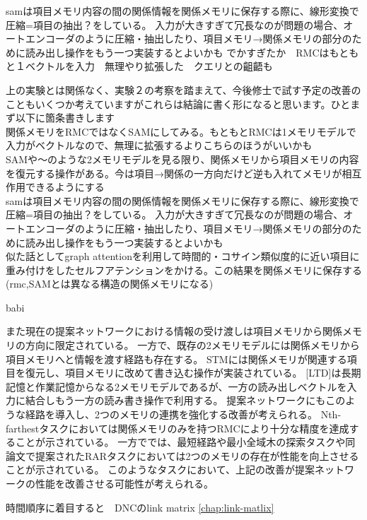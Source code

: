 samは項目メモリ内容の間の関係情報を関係メモリに保存する際に、線形変換で圧縮=項目の抽出？をしている。
入力が大きすぎて冗長なのが問題の場合、オートエンコーダのように圧縮・抽出したり、項目メモリ→関係メモリの部分のために読み出し操作をもう一つ実装するとよいかも
でかすぎたか　RMCはもともと１ベクトルを入力　無理やり拡張した　クエリとの齟齬も

上の実験とは関係なく、実験２の考察を踏まえて、今後修士で試す予定の改善のこともいくつか考えていますがこれらは結論に書く形になると思います。ひとまず以下に箇条書きします
\\関係メモリをRMCではなくSAMにしてみる。もともとRMCは1メモリモデルで入力がベクトルなので、無理に拡張するよりこちらのほうがいいかも
\\SAMや\cite{working2mem}〜のような2メモリモデルを見る限り、関係メモリから項目メモリの内容を復元する操作がある。今は項目→関係の一方向だけど逆も入れてメモリが相互作用できるようにする
\\samは項目メモリ内容の間の関係情報を関係メモリに保存する際に、線形変換で圧縮=項目の抽出？をしている。
入力が大きすぎて冗長なのが問題の場合、オートエンコーダのように圧縮・抽出したり、項目メモリ→関係メモリの部分のために読み出し操作をもう一つ実装するとよいかも
\\似た話としてgraph attentionを利用して時間的・コサイン類似度的に近い項目に重み付けをしたセルフアテンションをかける。この結果を関係メモリに保存する(rmc,SAMとは異なる構造の関係メモリになる)

babi 

また現在の提案ネットワークにおける情報の受け渡しは項目メモリから関係メモリの方向に限定されている。
一方で、既存の2メモリモデルには関係メモリから項目メモリへと情報を渡す経路も存在する。
STMには関係メモリが関連する項目を復元し、項目メモリに改めて書き込む操作が実装されている。
[LTD]は長期記憶と作業記憶からなる2メモリモデルであるが、一方の読み出しベクトルを入力に結合しもう一方の読み書き操作で利用する。
提案ネットワークにもこのような経路を導入し、2つのメモリの連携を強化する改善が考えられる。
Nth-farthestタスクにおいては関係メモリのみを持つRMCにより十分な精度を達成することが示されている。
一方で\cite{sam}では、最短経路や最小全域木の探索タスクや同論文で提案されたRARタスクにおいては2つのメモリの存在が性能を向上させることが示されている。
このようなタスクにおいて、上記の改善が提案ネットワークの性能を改善させる可能性が考えられる。

時間順序に着目すると　DNCのlink matrix
\ref{chap:link-matlix}
